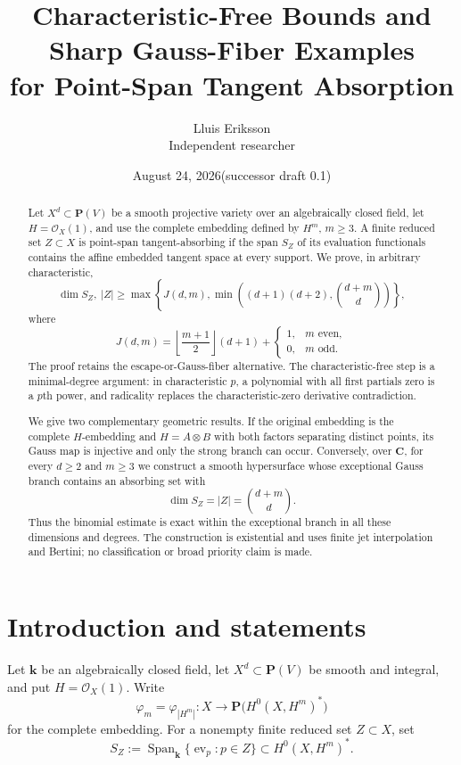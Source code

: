 \documentclass[11pt]{article}
\title{Characteristic-Free Bounds and Sharp Gauss-Fiber Examples\\
for Point-Span Tangent Absorption}
\author{Lluis Eriksson\\\small Independent researcher}
\date{August 24, 2026\quad (successor draft 0.1)}
\newcommand{\PP}{\mathbf P}
\newcommand{\CC}{\mathbf C}
\newcommand{\kk}{\mathbf k}
\newcommand{\cO}{\mathcal O}
\newcommand{\Span}{\operatorname{Span}}
\begin{document}
\maketitle

\begin{abstract}
Let $X^d\subset\PP(V)$ be a smooth projective variety over an algebraically
closed field, let $H=\cO_X(1)$, and use the complete embedding defined by
$H^m$, $m\geq3$.  A finite reduced set $Z\subset X$ is point-span
tangent-absorbing if the span $S_Z$ of its evaluation functionals contains the
affine embedded tangent space at every support.  We prove, in arbitrary
characteristic,
\[
 \dim S_Z,\ |Z|\geq
 \max\left\{J(d,m),
 \min\left((d+1)(d+2),\binom{d+m}{d}\right)\right\},
\]
where
\[
 J(d,m)=\left\lfloor\frac{m+1}{2}\right\rfloor(d+1)
       +\begin{cases}1,&m\text{ even},\\0,&m\text{ odd}.
         \end{cases}
\]
The proof retains the escape-or-Gauss-fiber alternative.  The
characteristic-free step is a minimal-degree argument: in characteristic
$p$, a polynomial with all first partials zero is a $p$th power, and
radicality replaces the characteristic-zero derivative contradiction.

We give two complementary geometric results.  If the original embedding is
the complete $H$-embedding and $H=A\otimes B$ with both factors separating
distinct points, its Gauss map is injective and only the strong branch can
occur.  Conversely, over
$\CC$, for every $d\geq2$ and $m\geq3$ we construct a smooth hypersurface
whose exceptional Gauss branch contains an absorbing set with
\[
 \dim S_Z=|Z|=\binom{d+m}{d}.
\]
Thus the binomial estimate is exact within the exceptional branch in all
these dimensions and degrees.  The construction is existential and uses
finite jet interpolation and Bertini; no classification or broad priority
claim is made.
\end{abstract}

\section{Introduction and statements}

Let $\kk$ be an algebraically closed field, let
$X^d\subset\PP(V)$ be smooth and integral, and put $H=\cO_X(1)$.  Write
\[
 \varphi_m=\varphi_{|H^m|}:X\longrightarrow
 \PP\bigl(H^0(X,H^m)^*\bigr)
\]
for the complete embedding.  For a nonempty finite reduced set $Z\subset X$,
set
\[
 S_Z:=\Span_{\kk}\{\operatorname{ev}_p:p\in Z\}
       \subset H^0(X,H^m)^*.
\]
\end{document}
